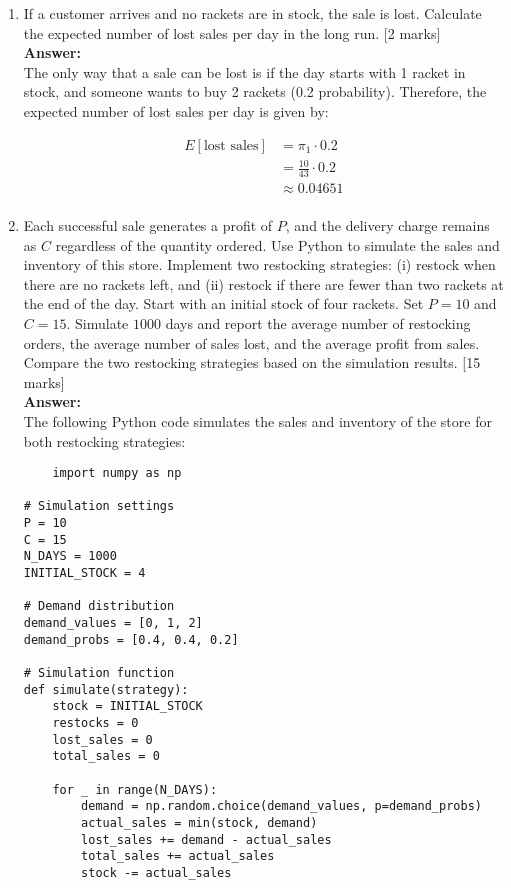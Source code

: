 \documentclass[12pt]{article}
\begin{document}
\begin{enumerate}
\begin{enumerate}
\item If a customer arrives and no rackets are in stock, the sale is lost. Calculate the expected number of lost sales per day in the long run. 
			\hfill [2 marks]
%
\\
\textbf{Answer:}
\\
The only way that a sale can be lost is if the day starts with 1 racket in stock, and someone wants to buy 2 rackets (0.2 probability). Therefore, the expected number of lost sales per day is given by:

\begin{align*}
E[\text{lost sales}] &= \pi_1 \cdot 0.2 \\
&= \frac{10}{43} \cdot 0.2 \\
&\approx 0.04651 \\
\end{align*}

\item Each successful sale generates a profit of $P$, and the delivery charge remains as $C$ regardless of the quantity ordered. Use {\sf Python} to simulate the sales and inventory of this store. Implement two restocking strategies: (i) restock when there are no rackets left, and (ii) restock if there are fewer than two rackets at the end of the day. 
Start with an initial stock of four rackets. Set $P=10$ and $C=15$. Simulate $1000$ days and report the average number of restocking orders, the average number of sales lost, and the average profit from sales. Compare the two restocking strategies based on the simulation results.   
			\hfill [15 marks]
%
\\
\textbf{Answer:}
\\

The following Python code simulates the sales and inventory of the store for both restocking strategies:
\begin{verbatim}
	import numpy as np

# Simulation settings
P = 10
C = 15
N_DAYS = 1000
INITIAL_STOCK = 4

# Demand distribution
demand_values = [0, 1, 2]
demand_probs = [0.4, 0.4, 0.2]

# Simulation function
def simulate(strategy):
    stock = INITIAL_STOCK
    restocks = 0
    lost_sales = 0
    total_sales = 0

    for _ in range(N_DAYS):
        demand = np.random.choice(demand_values, p=demand_probs)
        actual_sales = min(stock, demand)
        lost_sales += demand - actual_sales
        total_sales += actual_sales
        stock -= actual_sales


\end{verbatim}
\end{enumerate}
\end{enumerate}
\end{document}
